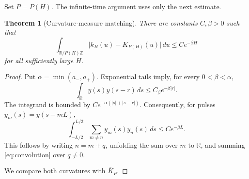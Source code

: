 \documentclass[11pt]{article}
\newtheorem{theorem}{Theorem}[section]
\theoremstyle{remark}
\newcommand{\R}{\mathbb R}
\newcommand{\abs}[1]{\lvert #1\rvert}
\begin{document}
Set \(P=P(H)\).  The infinite-time argument uses only the next estimate.

\begin{theorem}[Curvature-measure matching]\label{thm:L1match}
There are constants $C,\beta>0$ such that
\begin{equation}\label{eq:L1match}
  \int_{\R/P(H)\mathbb Z}
  \abs{k_H(u)-K_{P(H)}(u)}\,du
  \leq Ce^{-\beta H}
\end{equation}
for all sufficiently large $H$.
\end{theorem}

\begin{proof}
Put $\alpha=\min(a_-,a_+)$.  Exponential tails imply, for every
$0<\beta<\alpha$,
\begin{equation}\label{eq:convolution}
  \int_\R y(s)y(s-r)\,ds\leq C_\beta e^{-\beta\abs r}.
\end{equation}
The integrand is bounded by
\(Ce^{-\alpha(\abs s+\abs{s-r})}\).  Consequently, for pulses
$y_m(s)=y(s-mL)$,
\begin{equation}\label{eq:pairwise-L1}
  \int_{-L/2}^{L/2}\sum_{m\ne n}y_m(s)y_n(s)\,ds
  \leq Ce^{-\beta L}.
\end{equation}
This follows by writing $n=m+q$, unfolding the sum over $m$ to $\R$, and
summing \eqref{eq:convolution} over $q\ne0$.

We compare both curvatures with \(\overline K_P\).


\end{proof}
\end{document}
